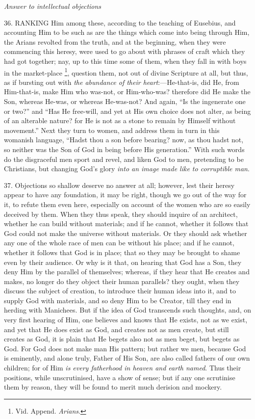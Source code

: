 
\emph{Answer
to intellectual objections}

36. RANKING
Him among these, according to the teaching of Eusebius, and accounting
Him to be such as are the things which come into being through Him,
the Arians revolted from the truth, and at the beginning, when they
were commencing this heresy, were used to go about with phrases of
craft which they had got together; nay, up to this time some of them,
when they fall in with boys in the market-place \footnote{Vid. Append. \emph{Arians}.}, question them, not out of divine Scripture at all, but thus,
as if bursting out with \emph{the abundance of their heart}:—He-that-is,
did He, from Him-that-is, make Him who was-not, or Him-who-was?
therefore did He make the Son, whereas He-was, or whereas He-was-not?
And again, ``Is the ingenerate one or two?'' and ``Has He free-will, and
yet at His own choice does not alter, as being of an alterable nature?
for He is not as a stone to remain by Himself without movement.'' Next
they turn to women, and address them in turn in this womanish
language, ``Hadst thou a son before bearing? now, as thou hadst not, so
neither was the Son of God in being before His generation.'' With such
words do the disgraceful men sport and revel, and liken God to men,
pretending to be Christians, but changing God's glory \emph{into an
image made like to corruptible man}.

37. Objections so shallow
deserve no answer at all; however, lest their heresy appear to have
any foundation, it may be right, though we go out of the way for it,
to refute them even here, especially on account of the women who are
so easily deceived by them. When they thus speak, they should inquire
of an architect, whether he can build without materials; and if he
cannot, whether it follows that God could not make the universe
without materials. Or they should ask whether any one of the whole
race of men can be without his place; and if he cannot, whether it
follows that God is in place; that so they may be brought to shame
even by their audience. Or why is it that, on hearing that God has a
Son, they deny Him by the parallel of themselves; whereas, if they
hear that He creates and makes, no longer do they object their human
parallels? they ought, when they discuss the subject of creation, to
introduce their human ideas into it, and to supply God with materials,
and so deny Him to be Creator, till they end in herding with Manichees.
But if the idea of God transcends such thoughts, and, on very first
hearing of Him, one believes and knows that He exists, not as we
exist, and yet that He does exist as God, and creates not as men
create, but still creates as God, it is plain that He begets also not
as men beget, but begets as God. For God does not make man His
pattern; but rather we men, because God is eminently, and alone truly,
Father of His Son, are also called fathers of our own children; for of
Him \emph{is every fatherhood in heaven and earth named}. Thus their
positions, while unscrutinised, have a show of sense; but if any one
scrutinise them by reason, they will be found to merit much derision
and mockery.

